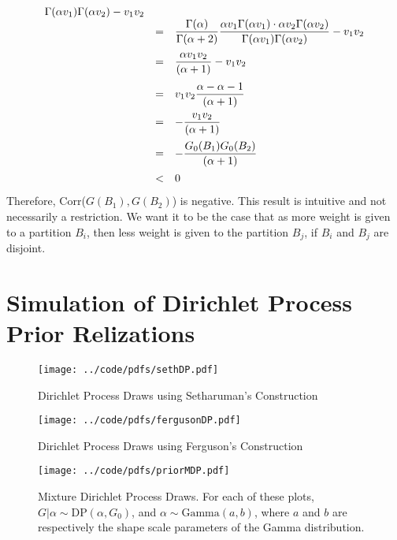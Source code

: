 \documentclass{article}
\def\beginmyfig{\begin{figure}[htbp]\begin{center}}
\def\endmyfig{\end{center}\end{figure}}
\def\ds{\displaystyle}
\begin{document}
\[\begin{array}{rcl}
                            {\Gamma(\alpha v_1)\Gamma(\alpha v_2)} - v_1 v_2\\
                            \vspace{.7em}
                        &=& \ds\frac{\Gamma(\alpha)}{\Gamma(\alpha+2)}
                            \ds\frac{\alpha v_1\Gamma(\alpha v_1) \cdot \alpha v_2\Gamma(\alpha v_2)}
                            {\Gamma(\alpha v_1)\Gamma(\alpha v_2)} - v_1 v_2\\
                            \vspace{.7em}
                        &=& \ds\frac{\alpha v_1 v_2}{(\alpha +1)} - v_1 v_2 \\
                            \vspace{.5em}
                        &=& v_1 v_2 \ds\frac{\alpha - \alpha - 1}{(\alpha +1)} \\
                            \vspace{.5em}
                        &=& -\ds\frac{v_1 v_2 }{(\alpha +1)} \\
                            \vspace{.5em}
                        &=& -\ds\frac{G_0(B_1) G_0(B_2) }{(\alpha +1)} \\
                        &<& 0 \\
  \end{array}
\]
Therefore, Corr($G(B_1),G(B_2)$) is negative. This result is intuitive and not necessarily a restriction.
We want it to be the case that as more weight is given to a partition $B_i$, then less weight is
given to the partition $B_j$, if $B_i$ and $B_j$ are disjoint.

\newpage
\section{Simulation of Dirichlet Process Prior Relizations}
\beginmyfig
  \texttt{[image: ../code/pdfs/sethDP.pdf]}
  \caption{Dirichlet Process Draws using Setharuman's Construction}
\endmyfig
\beginmyfig
  \texttt{[image: ../code/pdfs/fergusonDP.pdf]}
  \caption{Dirichlet Process Draws using Ferguson's Construction}
\endmyfig
\beginmyfig
  \texttt{[image: ../code/pdfs/priorMDP.pdf]}
  \caption{Mixture Dirichlet Process Draws. For each of these plots, 
  $G|\alpha \sim \text{DP}(\alpha,G_0)$, and $\alpha \sim \text{Gamma}(a,b)$,
  where $a$ and $b$ are respectively the shape scale parameters of the 
  Gamma distribution.}
\endmyfig

\newpage
\end{document}
